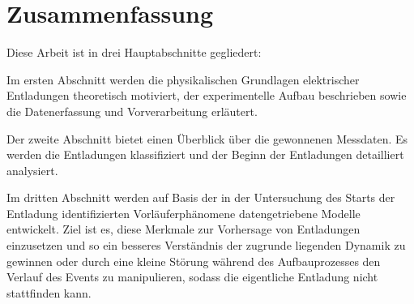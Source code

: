 \section{Zusammenfassung}
\label{sec:intro_summary}
Diese Arbeit ist in drei Hauptabschnitte gegliedert:

Im ersten Abschnitt werden die physikalischen Grundlagen elektrischer Entladungen theoretisch motiviert, der experimentelle Aufbau beschrieben sowie die Datenerfassung und Vorverarbeitung erläutert.

Der zweite Abschnitt bietet einen Überblick über die gewonnenen Messdaten. Es werden die Entladungen klassifiziert und der Beginn der Entladungen detailliert analysiert.

Im dritten Abschnitt werden auf Basis der in der Untersuchung des Starts der Entladung identifizierten Vorläuferphänomene datengetriebene Modelle entwickelt. Ziel ist es, diese Merkmale zur Vorhersage von Entladungen einzusetzen und so ein besseres Verständnis der zugrunde liegenden Dynamik zu gewinnen oder durch eine kleine Störung während des Aufbauprozesses den Verlauf des Events zu manipulieren, sodass die eigentliche Entladung nicht stattfinden kann.
